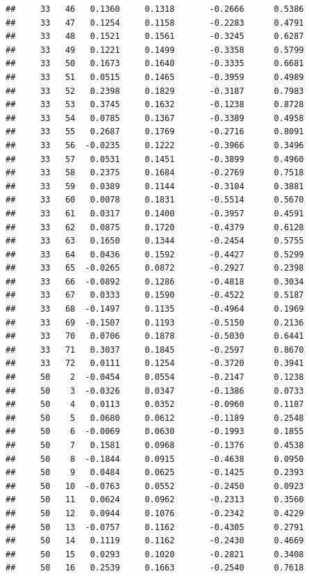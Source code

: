 \documentclass[
]{article}
\begin{document}
\begin{verbatim}
##     33   46   0.1360     0.1318       -0.2666      0.5386  
##     33   47   0.1254     0.1158       -0.2283      0.4791  
##     33   48   0.1521     0.1561       -0.3245      0.6287  
##     33   49   0.1221     0.1499       -0.3358      0.5799  
##     33   50   0.1673     0.1640       -0.3335      0.6681  
##     33   51   0.0515     0.1465       -0.3959      0.4989  
##     33   52   0.2398     0.1829       -0.3187      0.7983  
##     33   53   0.3745     0.1632       -0.1238      0.8728  
##     33   54   0.0785     0.1367       -0.3389      0.4958  
##     33   55   0.2687     0.1769       -0.2716      0.8091  
##     33   56  -0.0235     0.1222       -0.3966      0.3496  
##     33   57   0.0531     0.1451       -0.3899      0.4960  
##     33   58   0.2375     0.1684       -0.2769      0.7518  
##     33   59   0.0389     0.1144       -0.3104      0.3881  
##     33   60   0.0078     0.1831       -0.5514      0.5670  
##     33   61   0.0317     0.1400       -0.3957      0.4591  
##     33   62   0.0875     0.1720       -0.4379      0.6128  
##     33   63   0.1650     0.1344       -0.2454      0.5755  
##     33   64   0.0436     0.1592       -0.4427      0.5299  
##     33   65  -0.0265     0.0872       -0.2927      0.2398  
##     33   66  -0.0892     0.1286       -0.4818      0.3034  
##     33   67   0.0333     0.1590       -0.4522      0.5187  
##     33   68  -0.1497     0.1135       -0.4964      0.1969  
##     33   69  -0.1507     0.1193       -0.5150      0.2136  
##     33   70   0.0706     0.1878       -0.5030      0.6441  
##     33   71   0.3037     0.1845       -0.2597      0.8670  
##     33   72   0.0111     0.1254       -0.3720      0.3941  
##     50    2  -0.0454     0.0554       -0.2147      0.1238  
##     50    3  -0.0326     0.0347       -0.1386      0.0733  
##     50    4   0.0113     0.0352       -0.0960      0.1187  
##     50    5   0.0680     0.0612       -0.1189      0.2548  
##     50    6  -0.0069     0.0630       -0.1993      0.1855  
##     50    7   0.1581     0.0968       -0.1376      0.4538  
##     50    8  -0.1844     0.0915       -0.4638      0.0950  
##     50    9   0.0484     0.0625       -0.1425      0.2393  
##     50   10  -0.0763     0.0552       -0.2450      0.0923  
##     50   11   0.0624     0.0962       -0.2313      0.3560  
##     50   12   0.0944     0.1076       -0.2342      0.4229  
##     50   13  -0.0757     0.1162       -0.4305      0.2791  
##     50   14   0.1119     0.1162       -0.2430      0.4669  
##     50   15   0.0293     0.1020       -0.2821      0.3408  
##     50   16   0.2539     0.1663       -0.2540      0.7618  

\end{verbatim}
\end{document}
